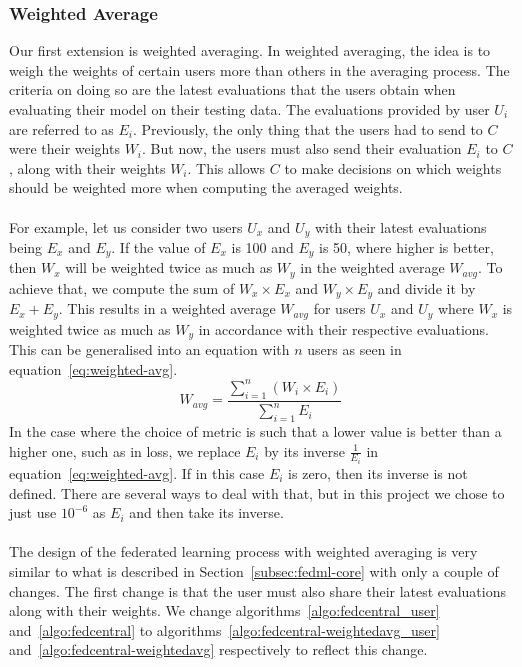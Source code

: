 \documentclass[12pt]{article}
\begin{document}
\subsubsection{Weighted Average}\label{subsubsec:weighted-avg}
Our first extension is weighted averaging. In weighted averaging, the idea is to weigh the weights of certain users more than others in the averaging process. The criteria on doing so are the latest evaluations that the users obtain when evaluating their model on their testing data. The evaluations provided by user $U_i$ are referred to as $E_i$. Previously, the only thing that the users had to send to $C$ were their weights $W_i$. But now, the users must also send their evaluation $E_i$ to $C$, along with their weights $W_i$. This allows $C$ to make decisions on which weights should be weighted more when computing the averaged weights.
\\\\
For example, let us consider two users $U_x$ and $U_y$ with their latest evaluations being $E_x$ and $E_y$. If the value of $E_x$ is 100 and $E_y$ is 50, where higher is better, then $W_x$ will be weighted twice as much as $W_y$ in the weighted average $W_{avg}$. To achieve that, we compute the sum of $W_x \times E_x$ and $W_y \times E_y$ and divide it by $E_x + E_y$. This results in a weighted average $W_{avg}$ for users $U_x$ and $U_y$ where $W_x$ is weighted twice as much as $W_y$ in accordance with their respective evaluations. This can be generalised into an equation with $n$ users as seen in equation~\ref{eq:weighted-avg}.
\begin{equation}\label{eq:weighted-avg}
	W_{avg} = \frac{\sum_{i=1}^{n} \left({W_i \times E_i}\right)}{\sum_{i=1}^{n} {E_i}}
\end{equation}
In the case where the choice of metric is such that a lower value is better than a higher one, such as in loss, we replace $E_i$ by its inverse $\frac{1}{E_i}$ in equation~\ref{eq:weighted-avg}. If in this case $E_i$ is zero, then its inverse is not defined. There are several ways to deal with that, but in this project we chose to just use $10^{-6}$ as $E_i$ and then take its inverse. 
\\\\
The design of the federated learning process with weighted averaging is very similar to what is described in Section~\ref{subsec:fedml-core} with only a couple of changes. The first change is that the user must also share their latest evaluations along with their weights. We change algorithms~\ref{algo:fedcentral_user} and~\ref{algo:fedcentral} to algorithms~\ref{algo:fedcentral-weightedavg_user} and~\ref{algo:fedcentral-weightedavg} respectively to reflect this change.
\end{document}
